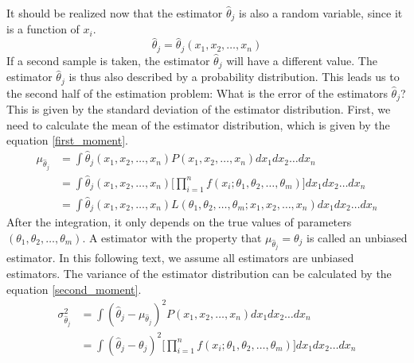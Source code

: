 \documentclass[12pt,a4paper]{report}
\begin{document}
It should be realized now that the estimator $\hat{\theta}_j$ is also a random variable, since it is a function of $x_i$.
\begin{equation}
\hat{\theta}_j = \hat{\theta}_j(x_1,x_2,\dots,x_n)
\end{equation}
If a second sample is taken, the estimator $\hat{\theta}_j$ will have a different value.
The estimator $\hat{\theta}_j$ is thus also described by a probability distribution.
This leads us to the second half of the estimation problem: What is the error of the estimators $\hat{\theta}_j$?
This is given by the standard deviation of the estimator distribution.
First, we need to calculate the mean of the estimator distribution, which is given by the equation \ref{first_moment}.
\begin{align}
\mu_{\hat{\theta}_j} &= \int \hat{\theta}_j(x_1,x_2,\dots,x_n) P(x_1,x_2,\dots,x_n) dx_1 dx_2 \dots dx_n \\
&= \int \hat{\theta}_j(x_1,x_2,\dots,x_n) \Big[ \prod_{i = 1}^{n} f(x_i;\theta_1,\theta_2,\dots,\theta_m) \Big] dx_1 dx_2 \dots dx_n \\
&= \int \hat{\theta}_j(x_1,x_2,\dots,x_n) L(\theta_1,\theta_2,\dots,\theta_m;x_1,x_2,\dots,x_n) dx_1 dx_2 \dots dx_n
\end{align}
After the integration, it only depends on the true values of parameters $(\theta_1,\theta_2,\dots,\theta_m)$.
A estimator with the property that $\mu_{\hat{\theta}_j} = \theta_j$ is called an unbiased estimator.
In this following text, we assume all estimators are unbiased estimators.
The variance of the estimator distribution can be calculated by the equation \ref{second_moment}.
\begin{align}
\sigma_{\hat{\theta}_j}^2 &= \int (\hat{\theta}_j - \mu_{\hat{\theta}_j} )^2 P(x_1,x_2,\dots,x_n) dx_1 dx_2 \dots dx_n \\
&= \int (\hat{\theta}_j - \theta_j )^2 \Big[ \prod_{i = 1}^{n} f(x_i;\theta_1,\theta_2,\dots,\theta_m) \Big] dx_1 dx_2 \dots dx_n
\end{align}
\end{document}
